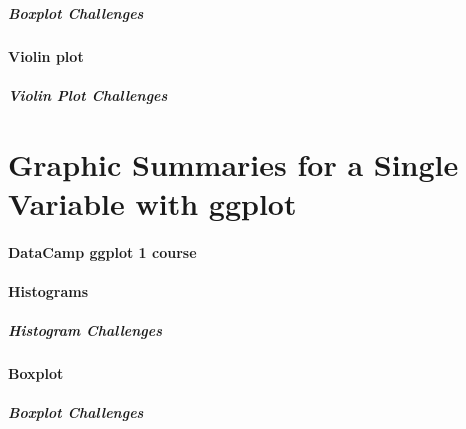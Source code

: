 \documentclass[]{book}
\let\oldparagraph\paragraph
\renewcommand{\paragraph}[1]{\oldparagraph{#1}\mbox{}}
\theoremstyle{definition}
\theoremstyle{definition}
\theoremstyle{definition}
\theoremstyle{remark}
\begin{document}
\hypertarget{boxplot-challenges}{%
\paragraph{Boxplot Challenges}\label{boxplot-challenges}}

\hypertarget{violin-plot}{%
\subsubsection{Violin plot}\label{violin-plot}}

\hypertarget{violin-plot-challenges}{%
\paragraph{Violin Plot Challenges}\label{violin-plot-challenges}}

\hypertarget{graphic-summaries-for-a-single-variable-with-ggplot-1}{%
\chapter{Graphic Summaries for a Single Variable with
ggplot}\label{graphic-summaries-for-a-single-variable-with-ggplot-1}}

\hypertarget{datacamp-ggplot-1-course-1}{%
\subsubsection{DataCamp ggplot 1
course}\label{datacamp-ggplot-1-course-1}}

\hypertarget{histograms-2}{%
\subsubsection{Histograms}\label{histograms-2}}

\hypertarget{histogram-challenges-1}{%
\paragraph{Histogram Challenges}\label{histogram-challenges-1}}

\hypertarget{boxplot-1}{%
\subsubsection{Boxplot}\label{boxplot-1}}

\hypertarget{boxplot-challenges-1}{%
\paragraph{Boxplot Challenges}\label{boxplot-challenges-1}}
\end{document}
